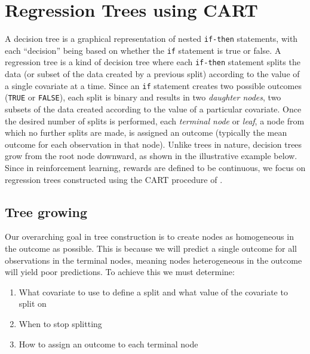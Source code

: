 \documentclass[12pt]{article}
\begin{document}

\section{Regression Trees using CART} %
\label{sec:rpart}

A decision tree is a graphical representation of nested \texttt{if-then} statements, with each ``decision'' being based on whether the \texttt{if} statement is true or false. A regression tree is a kind of decision tree where each \texttt{if-then} statement splits the data (or subset of the data created by a previous split) according to the value of a single covariate at a time. Since an \texttt{if} statement creates two possible outcomes (\texttt{TRUE} or \texttt{FALSE}), each split is binary and results in two \emph{daughter nodes}, two subsets of the data created according to the value of a particular covariate. Once the desired number of splits is performed, each \emph{terminal node} or \emph{leaf}, a node from which no further splits are made, is assigned an outcome (typically the mean outcome for each observation in that node). Unlike trees in nature, decision trees grow from the root node downward, as shown in the illustrative example below. Since in reinforcement learning, rewards are defined to be continuous, we focus on regression trees constructed using the CART procedure of \textcite{CART}.


\subsection{Tree growing} %
\label{sub:tree_growing}

Our overarching goal in tree construction is to create nodes as homogeneous in the outcome as possible. This is because we will predict a single outcome for all observations in the terminal nodes, meaning nodes heterogeneous in the outcome will yield poor predictions. To achieve this we must determine:

\begin{enumerate}
  \item What covariate to use to define a split and what value of the covariate to split on
  \item When to stop splitting
  \item How to assign an outcome to each terminal node
\end{enumerate}
\end{document}
